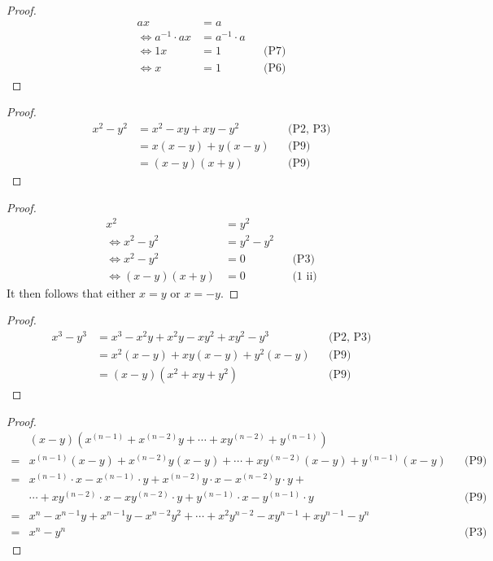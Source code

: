 \begin{proof}
    \begin{align*}
        ax &= a & & \\
        \iff a^{-1} \cdot ax &= a^{-1} \cdot a && \\
        \iff 1x &= 1 && \text{(P7)} \\
        \iff x &= 1 && \text{(P6)}
    \end{align*}
\end{proof}
\begin{proof}
    \begin{align*}
        x^2 - y^2 &= x^2 - xy + xy - y^2 && \text{(P2, P3)} \\
                  &= x(x - y) + y(x - y) && \text{(P9)} \\
                  &= (x - y)(x + y) && \text{(P9)}
    \end{align*}
\end{proof}
\begin{proof}
    \begin{align*}
        x^2 &= y^2  && \\
        \iff x^2 - y^2 &= y^2 - y^2 && \\
        \iff x^2 - y^2 &= 0 && \text{(P3)} \\
        \iff (x - y)(x + y) &= 0 && \text{(1 ii)}
    \end{align*}
    It then follows that either $x = y$ or $x = -y$.
\end{proof}
\begin{proof}
    \begin{align*}
        x^3 - y^3 &= x^3 - x^2y + x^2y - xy^2 + xy^2 - y^3 && \text{(P2, P3)} \\
                  &= x^2(x - y) + xy(x - y) + y^2(x - y) && \text{(P9)} \\
                  &= (x - y)(x^2 + xy + y^2) && \text{(P9)}
    \end{align*}
\end{proof}
\begin{proof}
    \begin{align*}
        &(x - y)(x^{(n - 1)} + x^{(n - 2)}y + \cdots + xy^{(n - 2)} + y^{(n - 1)}) && \\
            = &x^{(n - 1)}(x - y) + x^{(n - 2)}y(x - y) + \cdots + xy^{(n - 2)}(x - y) + y^{(n - 1)}(x - y) && \text{(P9)} \\
            = &x^{(n - 1)} \cdot x - x^{(n - 1)} \cdot y + x^{(n - 2)}y \cdot x - x^{(n - 2)}y \cdot y + &&  \\
               &\cdots + xy^{(n - 2)} \cdot x - xy^{(n - 2)} \cdot y + y^{(n - 1)} \cdot x - y^{(n - 1)} \cdot y && \text{(P9)} \\
            = &x^n - x^{n - 1}y + x^{n - 1}y - x^{n - 2}y^2 + 
              \cdots + x^2y^{n - 2} - xy^{n - 1} + xy^{n - 1} - y^n && \\
            = & x^n - y^n && \text{(P3)}
    \end{align*}
\end{proof}
